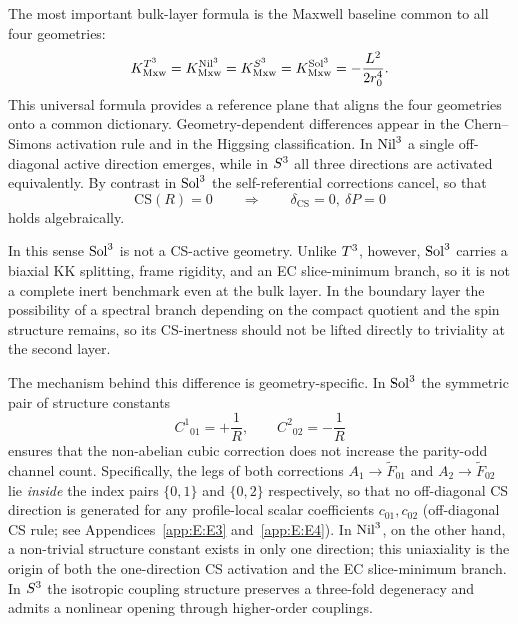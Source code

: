 The most important bulk-layer formula is the Maxwell baseline common to all
four geometries:
\begin{equation}
  K_{\mathrm{Mxw}}^{T^3}
  = K_{\mathrm{Mxw}}^{\mathrm{Nil}^3}
  = K_{\mathrm{Mxw}}^{S^3}
  = K_{\mathrm{Mxw}}^{\mathrm{Sol}^3}
  = -\frac{L^2}{2r_0^4}.
\end{equation}
This universal formula provides a reference plane that aligns the four
geometries onto a common dictionary.  Geometry-dependent differences appear
in the Chern--Simons activation rule and in the Higgsing classification.  In
$\mathrm{Nil}^3$ a single off-diagonal active direction emerges, while in
$S^3$ all three directions are activated equivalently.  By contrast in
$\mathrm{Sol}^3$ the self-referential corrections cancel, so that
\begin{equation}
  \mathrm{CS}(R) = 0
  \qquad \Longrightarrow \qquad
  \delta_{\mathrm{CS}} = 0,\ \delta P = 0
\end{equation}
holds algebraically.

In this sense $\mathrm{Sol}^3$ is not a CS-active geometry.  Unlike $T^3$,
however, $\mathrm{Sol}^3$ carries a biaxial KK splitting, frame rigidity, and an
EC slice-minimum branch, so it is not a complete inert benchmark even at the
bulk layer.  In the boundary layer the possibility of a spectral branch
depending on the compact quotient and the spin structure remains, so its
CS-inertness should not be lifted directly to triviality at the second layer.

The mechanism behind this difference is geometry-specific.  In $\mathrm{Sol}^3$
the symmetric pair of structure constants
\begin{equation}
  C^1{}_{01} = +\frac{1}{R}, \qquad
  C^2{}_{02} = -\frac{1}{R}
\end{equation}
ensures that the non-abelian cubic correction does not increase the
parity-odd channel count.  Specifically, the legs of both corrections
$A_1\to\tilde{F}_{01}$ and $A_2\to\tilde{F}_{02}$ lie \emph{inside} the index
pairs $\{0,1\}$ and $\{0,2\}$ respectively, so that no off-diagonal CS
direction is generated for any profile-local scalar coefficients
$c_{01}, c_{02}$ (off-diagonal CS rule; see
Appendices~\ref{app:E:E3} and~\ref{app:E:E4}).  In $\mathrm{Nil}^3$, on the other
hand, a non-trivial structure constant exists in only one direction; this
uniaxiality is the origin of both the one-direction CS activation and the
EC slice-minimum branch.  In $S^3$ the isotropic coupling structure
preserves a three-fold degeneracy and admits a nonlinear opening through
higher-order couplings.

